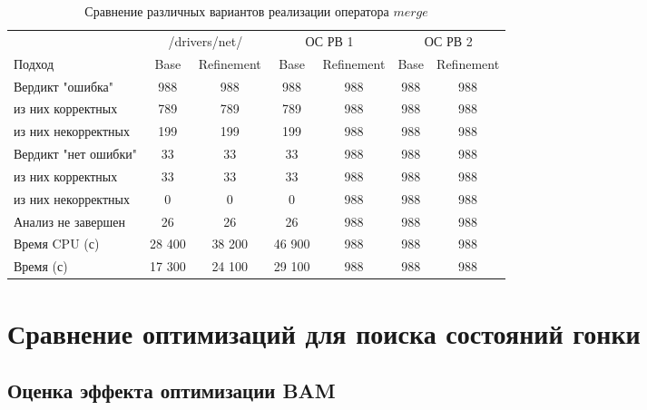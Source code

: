 \begin{center}
  \begin{table}[h]\footnotesize
  	\label{table-drivers-lock-refinement}
    \caption{Сравнение различных вариантов реализации оператора $merge$}
    \begin{tabular}{ | l | c | c | c | c | c | c | }
      \hline
      		& 		 \multicolumn{2}{|c|}{/drivers/net/} & 		 \multicolumn{2}{|c|}{ОС РВ 1} & 		 \multicolumn{2}{|c|}{ОС РВ 2}\\
      Подход         				& Base   	& Refinement 	& Base  & Refinement  & Base  & Refinement 	\\ \hline
      Вердикт "ошибка" 				& 988    	& 988        	& 988   & 988    		& 988   & 988  \\ 
  \hspace{0.5cm} из них корректных 	& 789 		& 789 			& 789   & 988  		& 988   & 988  	\\ 
  \hspace{0.5cm} из них некорректных & 199 		& 199 			& 199   & 988    	& 988   & 988  	\\ \hline
      Вердикт "нет ошибки"  		& 33      	& 33        	& 33   	& 988   	& 988   & 988  	\\ 
  \hspace{0.5cm} из них корректных 	& 33 		& 33    		& 33   	& 988    	& 988   & 988  	\\
  \hspace{0.5cm} из них некорректных & 0 		& 0    			& 0    	& 988  		& 988   & 988  	\\ \hline
      Анализ не завершен       		& 26     	& 26         	& 26   	& 988  		& 988   & 988  	\\ \hline
      Время CPU (с)   				& 28 400 	& 38 200     	& 46 900 & 988  	& 988   & 988  	\\ 
      Время (с)  					& 17 300 	& 24 100     	& 29 100 & 988    	& 988   & 988  	\\
      \hline
    \end{tabular}
  \end{table}
\end{center}

\section{Сравнение оптимизаций для поиска состояний гонки}

\subsection{Оценка эффекта оптимизации BAM}

